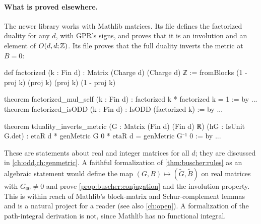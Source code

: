 \paragraph{What is proved elsewhere.} The newer library  works with
Mathlib matrices. Its file  defines the factorized duality for
any $d$, with GPR's signs, and proves that it is an involution and an element of $O(d,d;\mathbb{Z})$.
Its file  proves that the full duality inverts the metric at
$B=0$:
\begin{leancode}
def factorized (k : Fin d) : Matrix (Charge d) (Charge d) ℤ :=
  fromBlocks (1 - proj k) (proj k) (proj k) (1 - proj k)

theorem factorized_mul_self (k : Fin d) :
    factorized k * factorized k = 1 := by ...
theorem factorized_isODD (k : Fin d) : IsODD (factorized k) := by ...

theorem tduality_inverts_metric (G : Matrix (Fin d) (Fin d) ℝ)
    (hG : IsUnit G.det) :
    etaR d * genMetric G 0 * etaR d = genMetric G⁻¹ 0 := by ...
\end{leancode}
These are statements about real and integer matrices for all $d$; they are discussed in
\cref{ch:odd,ch:genmetric}. A faithful formalization of \cref{thm:buscher:rules} as an
algebraic statement would define the map $(G,B)\mapsto(\tilde G,\tilde B)$ on real matrices
with $G_{00}\neq0$ and prove \cref{prop:buscher:conjugation} and the involution property.
This is within reach of Mathlib's block-matrix and Schur-complement lemmas and is a natural
project for a reader (see also \cref{ch:open}). A formalization of the path-integral derivation is not, since Mathlib has
no functional integral.

